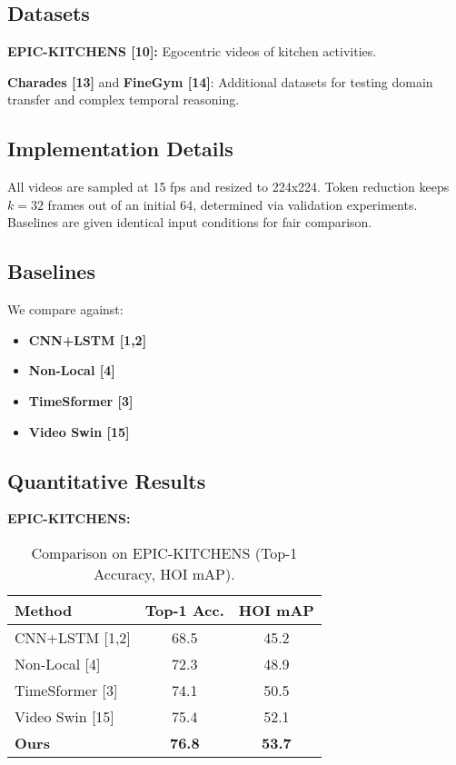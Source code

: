 \documentclass{article}
\begin{document}
\subsection{Datasets}
\textbf{EPIC-KITCHENS [10]:} Egocentric videos of kitchen activities.

\textbf{Charades [13]} and \textbf{FineGym [14]}: Additional datasets for testing domain transfer and complex temporal reasoning.

\subsection{Implementation Details}
All videos are sampled at 15 fps and resized to 224x224. Token reduction keeps $k=32$ frames out of an initial 64, determined via validation experiments. Baselines are given identical input conditions for fair comparison.

\subsection{Baselines}
We compare against:
\begin{itemize}
    \item \textbf{CNN+LSTM [1,2]}
    \item \textbf{Non-Local [4]}
    \item \textbf{TimeSformer [3]}
    \item \textbf{Video Swin [15]}
\end{itemize}

\subsection{Quantitative Results}
\textbf{EPIC-KITCHENS:}

\begin{table}[h]
\caption{Comparison on EPIC-KITCHENS (Top-1 Accuracy, HOI mAP).}
\label{main-results}
\vskip 0.15in
\begin{center}
\begin{small}
\begin{sc}
\begin{tabular}{lcc}
\toprule
Method & Top-1 Acc. & HOI mAP \\
\midrule
CNN+LSTM [1,2] & 68.5 & 45.2 \\
Non-Local [4] & 72.3 & 48.9 \\
TimeSformer [3] & 74.1 & 50.5 \\
Video Swin [15] & 75.4 & 52.1 \\
\textbf{Ours} & \textbf{76.8} & \textbf{53.7} \\
\bottomrule
\end{tabular}
\end{sc}
\end{small}
\end{center}
\vskip -0.1in
\end{table}
\end{document}
